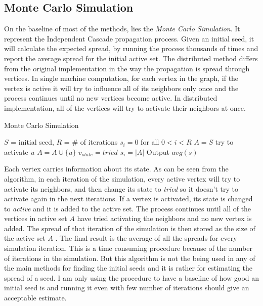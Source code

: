 \documentclass[english]{tktltiki}
\begin{document}
\subsection{Monte Carlo Simulation}
On the baseline of most of the methods, lies the \textit{Monte Carlo Simulation}. It represent the Independent Cascade propagation process. Given an initial seed, it will calculate the expected spread, by running the process thousands of times and report the average spread for the initial active set. The distributed method differs from the original implementation in the way the propagation is spread through vertices. In single machine computation, for each vertex in the graph, if the vertex is active it will try to influence all of its neighbors only once and the process continues until no new vertices become active. In distributed implementation, all of the vertices will try to activate their neighbors at once. 
\begin{algorithm}[ht!]
\caption{Monte Carlo Simulation}
\label{alg:simulation}
\begin{algorithmic}
\Require $S$ = initial seed, $R$ = \# of iterations
\State $s_i=0$ for all $0<i<R$
	\State $A=S$ 
				\State try to activate $u$
					\State $A=A\cup \{u\}$
				\EndIf
			\EndFor
			\State $v_{state} = tried$
		\EndIf
	\EndFor
	\State $s_i=|A|$	
\EndFor
\State Output $avg(s)$
\end{algorithmic}
\end{algorithm}
Each vertex carries information about its state. As can be seen from the algorithm, in each iteration of the simulation, every active vertex will try to activate its neighbors, and then change its state to \textit{tried} so it doesn't try to activate again in the next iterations. If a vertex is activated, its state is changed to \textit{active} and it is added to the active set. The process continues until all of the vertices in active set $A$ have tried activating the neighbors and no new vertex is added. The spread of that iteration of the simulation is then stored as the size of the active set $A$ . The final result is the average of all the spreads for every simulation iteration. This is a time consuming procedure because of the number of iterations in the simulation. But this algorithm is not the being used in any of the main methods for finding the initial seeds and it is rather for estimating the spread of a seed. I am only using the procedure to have a baseline of how good an initial seed is and running it even with few number of iterations should give an acceptable estimate.
\end{document}
